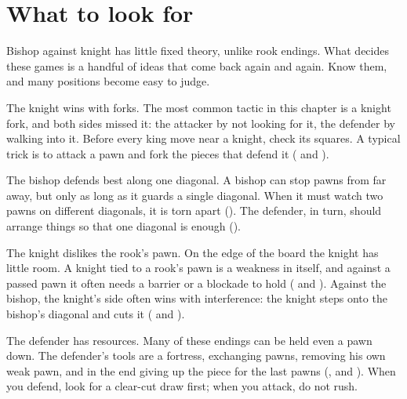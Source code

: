 \section*{What to look for}
Bishop against knight has little fixed theory, unlike rook endings. What decides these games is a
handful of ideas that come back again and again. Know them, and many positions become easy to judge.

The knight wins with forks. The most common tactic in this chapter is a
knight fork, and both sides missed it: the attacker by not looking for it, the defender by walking
into it. Before every king move near a knight, check its squares. A typical trick is to attack a
pawn and fork the pieces that defend it ( and
).

The bishop defends best along one diagonal. A bishop
can stop pawns from far away, but only as long as it guards a single diagonal. When it must watch
two pawns on different diagonals, it is torn apart ().
The defender, in turn, should arrange things so that one diagonal is enough
().

The knight dislikes the rook's pawn. On the edge of
the board the knight has little room. A knight tied to a rook's pawn is a weakness in itself, and
against a passed pawn it often needs a barrier or a blockade to hold
( and ). Against the
bishop, the knight's side often wins with interference:
the knight steps onto the bishop's diagonal and cuts it ( and
).

The defender has resources. Many of these endings can be held even a pawn down. The
defender's tools are a fortress, exchanging pawns,
removing his own weak pawn, and in the end giving up the
piece for the last pawns (,  and
). When you defend, look for a clear-cut draw first;
when you attack, do not rush.
